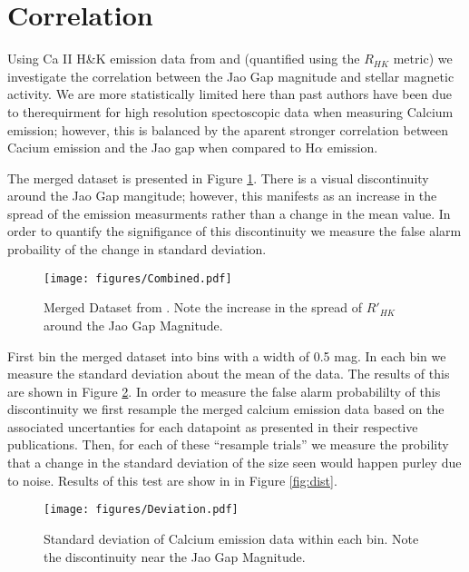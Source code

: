 \section{Correlation}\label{sec:results}
Using Ca II H\&K emission data from \citet{Boudreaux2022} and
\citet{Perdelwitz2021} (quantified using the $R_{HK}$ metric) we investigate
the correlation between the Jao Gap magnitude and stellar magnetic activity. We
are more statistically limited here than past authors have been due to
therequirment for high resolution spectoscopic data when measuring Calcium
emission; however, this is balanced by the aparent stronger correlation between
Cacium emission and the Jao gap when compared to H$\alpha$ emission. 

The merged dataset is presented in Figure \ref{fig:mergedData}. There is a
visual discontinuity around the Jao Gap mangitude; however, this manifests as
an increase in the spread of the emission measurments rather than a change in
the mean value. In order to quantify the signifigance of this discontinuity we
measure the false alarm probaility of the change in standard deviation.

\begin{figure}
  \centering
  \texttt{[image: figures/Combined.pdf]}
  \caption{Merged Dataset from \citet{Boudreaux2022, Perdelwitz2021}. Note the
  increase in the spread of $R'_{HK}$ around the Jao Gap Magnitude.}
  \label{fig:mergedData}
\end{figure}

First bin the merged dataset into bins with a width of 0.5 mag. In each bin we
measure the standard deviation about the mean of the data. The results of this
are shown in Figure \ref{fig:deviation}. In order to measure the false alarm
probabililty of this discontinuity we first resample the merged calcium
emission data based on the associated uncertanties for each datapoint as
presented in their respective publications. Then, for each of these ``resample
trials'' we measure the probility that a change in the standard deviation of
the size seen would happen purley due to noise. Results of this test are show in
in Figure \ref{fig:dist}. 

\begin{figure}
  \centering
  \texttt{[image: figures/Deviation.pdf]}
  \caption{Standard deviation of Calcium emission data within each bin. Note
  the discontinuity near the Jao Gap Magnitude.}
  \label{fig:deviation}
\end{figure}

